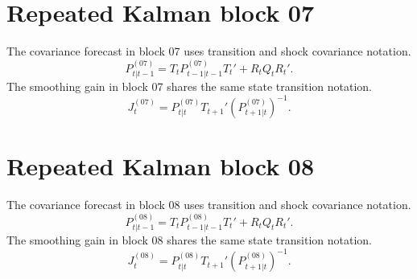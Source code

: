 \section{Repeated Kalman block 07}
The covariance forecast in block 07 uses transition and shock covariance notation.
\begin{equation}\label{eq:repeat-kalman-covariance-07}
P^{(07)}_{t|t-1} = T_t P^{(07)}_{t-1|t-1}T_t' + R_t Q_t R_t'.
\end{equation}
The smoothing gain in block 07 shares the same state transition notation.
\begin{equation}\label{eq:repeat-kalman-smoothing-07}
J^{(07)}_t = P^{(07)}_{t|t}T_{t+1}'(P^{(07)}_{t+1|t})^{-1}.
\end{equation}

\section{Repeated Kalman block 08}
The covariance forecast in block 08 uses transition and shock covariance notation.
\begin{equation}\label{eq:repeat-kalman-covariance-08}
P^{(08)}_{t|t-1} = T_t P^{(08)}_{t-1|t-1}T_t' + R_t Q_t R_t'.
\end{equation}
The smoothing gain in block 08 shares the same state transition notation.
\begin{equation}\label{eq:repeat-kalman-smoothing-08}
J^{(08)}_t = P^{(08)}_{t|t}T_{t+1}'(P^{(08)}_{t+1|t})^{-1}.
\end{equation}
